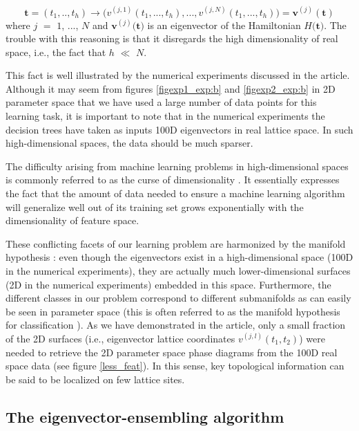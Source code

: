 \documentclass[fleqn,10pt]{wlscirep}
\begin{document}
\begin{equation}
\label{parameter_to_real}
\mathbf{t} = (t_1,..,t_h) \rightarrow \Big(v^{(j,1)}(t_1,...,t_h),...,v^{(j,N)}(t_1,...,t_h)\Big) = \mathbf{v}^{(j)}(\mathbf{t}) 
\end{equation}
where $j$ $=$ $1$, ..., $N$ and $\mathbf{v}^{(j)}$$($$\mathbf{t}$$)$ is an eigenvector of the Hamiltonian $H$$($$\mathbf{t}$$)$. The trouble with this reasoning is that it disregards the high dimensionality of real space, i.e., the fact that $h$ $\ll$ $N$.

This fact is well illustrated by the numerical experiments discussed in the article. Although it may seem from figures \ref{figexp1_exp:b} and \ref{figexp2_exp:b} in 2D parameter space that we have used a large number of data points for this learning task, it is important to note that in the numerical experiments the decision trees have taken as inputs 100D eigenvectors in real lattice space. In such high-dimensional spaces, the data should be much sparser.

The difficulty arising from machine learning problems in high-dimensional spaces is commonly referred to as the curse of dimensionality . It essentially expresses the fact that the amount of data needed to ensure a machine learning algorithm will generalize well out of its training set grows exponentially with the dimensionality of feature space.

These conflicting facets of our learning problem are harmonized by the manifold hypothesis : even though the eigenvectors exist in a high-dimensional space (100D in the numerical experiments), they are actually much lower-dimensional surfaces (2D in the numerical experiments) embedded in this space. Furthermore, the different classes in our problem correspond to different submanifolds as can easily be seen in parameter space (this is often referred to as the manifold hypothesis for classification ). As we have demonstrated in the article, only a small fraction of the 2D surfaces (i.e., eigenvector lattice coordinates $v^{(j,l)}(t_1,t_2)$) were needed to retrieve the 2D parameter space phase diagrams from the 100D real space data (see figure \ref{less_feat}). In this sense, key topological information can be said to be localized on few lattice sites.

\subsection*{The eigenvector-ensembling algorithm}
\end{document}
